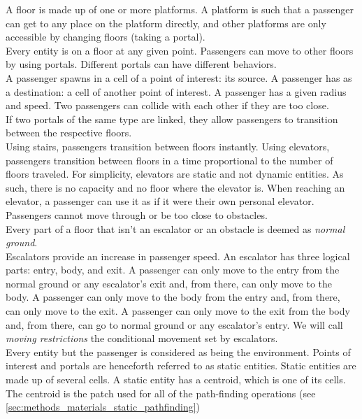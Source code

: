 A floor is made up of one or more platforms. A platform is such that a passenger can get to any place on the platform directly, and other platforms are only accessible by changing floors (taking a portal). \\
Every entity is on a floor at any given point. Passengers can move to other floors by using portals. Different portals can have different behaviors. \\
A passenger spawns in a cell of a point of interest: its source. A passenger has as a destination: a cell of another point of interest. A passenger has a given radius and speed. Two passengers can collide with each other if they are too close. \\
If two portals of the same type are linked, they allow passengers to transition between the respective floors. \\
Using stairs, passengers transition between floors instantly. Using elevators, passengers transition between floors in a time proportional to the number of floors traveled. For simplicity, elevators are static and not dynamic entities. As such, there is no capacity and no floor where the elevator is. When reaching an elevator, a passenger can use it as if it were their own personal elevator.\\
Passengers cannot move through or be too close to obstacles.\\
Every part of a floor that isn't an escalator or an obstacle is deemed as \textit{normal ground}.\\
Escalators provide an increase in passenger speed. An escalator has three logical parts: entry, body, and exit. A passenger can only move to the entry from the normal ground or any escalator's exit and, from there, can only move to the body. A passenger can only move to the body from the entry and, from there, can only move to the exit. A passenger can only move to the exit from the body and, from there, can go to normal ground or any escalator's entry. We will call \textit{moving restrictions} the conditional movement set by escalators.\\
Every entity but the passenger is considered as being the environment. Points of interest and portals are henceforth referred to as static entities. Static entities are made up of several cells. A static entity has a centroid, which is one of its cells. The centroid is the patch used for all of the path-finding operations (see \autoref{sec:methods_materials_static_pathfinding})\\

